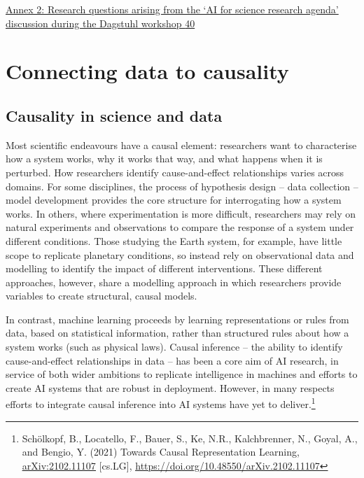 \protect\hyperlink{_Toc121762051}{Annex 2: Research questions arising
from the `AI for science research agenda' discussion during the Dagstuhl
workshop \protect\hyperlink{_Toc121762051}{40}}

\hypertarget{introduction-bridging-data-driven-and-mechanistic-modelling}{%



{%


\hypertarget{connecting-data-to-causality}{%
\section{Connecting data to
causality}\label{connecting-data-to-causality}}

\hypertarget{causality-in-science-and-data}{%
\subsection{Causality in science and
data}\label{causality-in-science-and-data}}

Most scientific endeavours have a causal element: researchers want to
characterise how a system works, why it works that way, and what happens
when it is perturbed. How researchers identify cause-and-effect
relationships varies across domains. For some disciplines, the process
of hypothesis design -- data collection -- model development provides
the core structure for interrogating how a system works. In others,
where experimentation is more difficult, researchers may rely on natural
experiments and observations to compare the response of a system under
different conditions. Those studying the Earth system, for example, have
little scope to replicate planetary conditions, so instead rely on
observational data and modelling to identify the impact of different
interventions. These different approaches, however, share a modelling
approach in which researchers provide variables to create structural,
causal models.

In contrast, machine learning proceeds by learning representations or
rules from data, based on statistical information, rather than
structured rules about how a system works (such as physical laws).
Causal inference -- the ability to identify cause-and-effect
relationships in data -- has been a core aim of AI research, in service
of both wider ambitions to replicate intelligence in machines and
efforts to create AI systems that are robust in deployment. However, in
many respects efforts to integrate causal inference into AI systems have
yet to deliver.\footnote{Schölkopf, B., Locatello, F., Bauer, S., Ke,
  N.R., Kalchbrenner, N., Goyal, A., and Bengio, Y. (2021) Towards
  Causal Representation Learning,
  \href{https://arxiv.org/abs/2102.11107}{\uline{arXiv:2102.11107}}
  {[}cs.LG{]},
  \href{https://doi.org/10.48550/arXiv.2102.11107}{\uline{https://doi.org/10.48550/arXiv.2102.11107}}}

}}
